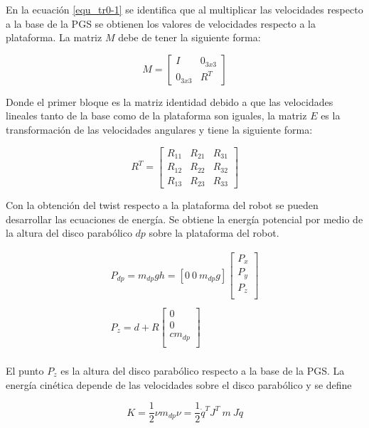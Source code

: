 En la ecuación \ref{equ_tr0-1} se identifica que al 
multiplicar las velocidades respecto a la base de la PGS se 
obtienen los valores de velocidades respecto a la 
plataforma. La matriz $M$ debe de tener la siguiente forma:

\begin{equation}
M = \begin{bmatrix}
I & 0_{3x3} \\
0_{3x3} & R^T
\end{bmatrix}
\end{equation}


Donde el primer bloque es la matriz identidad debido a que 
las velocidades lineales tanto de la base como de la 
plataforma son iguales, la matriz $E$ es la transformación 
de las velocidades angulares y tiene la siguiente forma:

\begin{equation*}
R^T = \begin{bmatrix}
R_{11} & R_{21} & R_{31}\\
R_{12} & R_{22} & R_{32}\\
R_{13} & R_{23} & R_{33}
\end{bmatrix}
\end{equation*}

Con la obtención del twist respecto a la plataforma del 
robot se pueden desarrollar las ecuaciones de energía. Se 
obtiene la energía potencial por medio de la altura del 
disco parabólico $dp$ sobre la plataforma del robot.

\begin{equation}
\begin{split}
P_{dp} = m_{dp}gh = [0\ 0\ m_{dp}g] \begin{bmatrix}
P_x\\
P_y\\
P_z\\
\end{bmatrix}\\
\\
P_z = d + R\begin{bmatrix}
0\\
0\\
cm_{dp}\\
\end{bmatrix}\\
\end{split}
\end{equation}

El punto $P_z$ es la altura del disco parabólico respecto a 
la base de la PGS. La energía cinética depende de las 
velocidades sobre el disco parabólico y se define

\begin{equation}
K = \frac{1}{2} \nu m_{dp} \nu = \frac{1}{2} \dot{q}^T J^T\ m\ J \dot{q}
\end{equation}
